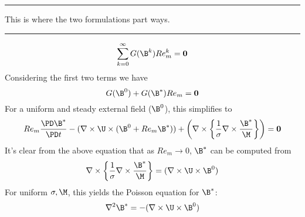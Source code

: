 \documentclass[11pt]{article}
\begin{document}
\noindent
\rule{\textwidth}{1pt}
\begin{center}
This is where the two formulations part ways.
\end{center}
\noindent
\rule{\textwidth}{1pt}
\begin{equation}
	\sum_{k=0}^{\infty} G(\B^k)
  Re_m^k
	=
	\mathbf{0}
\end{equation}
Considering the first two terms we have
\begin{equation}
  G(\B^0)
  +
  G(\B^{*}) Re_m
  =
  \mathbf{0}
\end{equation}
For a uniform and steady external field ($\B^0$), this simplifies to
\begin{equation}
  Re_m \frac{\PD \B^{*}}{\PD t}
  -
  (\nabla \times \U \times (\B^0 + Re_m \B^*))
  +
  \left(
  \nabla \times
  \left\{
  \frac{1}{\sigma}
  \nabla \times
  \frac{\B^{*}}{\M}
  \right\}
  \right)
  =
  \mathbf{0}
\end{equation}
It's clear from the above equation that as $Re_m \rightarrow 0$, $\B^*$ can be computed from
\begin{equation}
  \nabla \times
  \left\{
  \frac{1}{\sigma}
  \nabla \times
  \frac{\B^{*}}{\M}
  \right\}
  =
  (\nabla \times \U \times \B^0)
\end{equation}
For uniform $\sigma, \M$, this yields the Poisson equation for $\B^*$:
\begin{equation}
  \nabla^2 \B^{*}
  =
  -
  (\nabla \times \U \times \B^0)
\end{equation}
\end{document}
